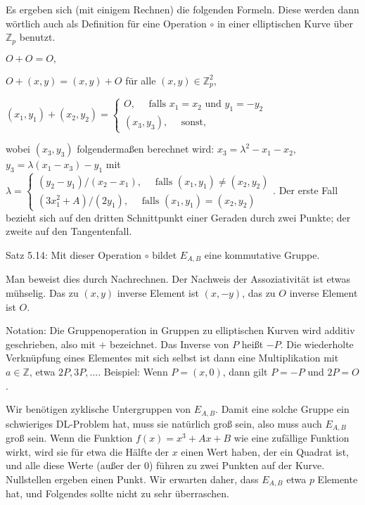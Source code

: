 \documentclass[a4paper]{article}
\begin{document}
\begin{multicols}{3}
    Es ergeben sich (mit einigem Rechnen) die folgenden Formeln. Diese werden dann wörtlich auch als Definition für eine Operation $\circ$ in einer elliptischen Kurve über $\mathbb{Z}_p$ benutzt.
    \begin{itemize*}
        \item $O+O=O,$
        \item $O+ (x,y) = (x,y) +O$ für alle $(x,y)\in\mathbb{Z}^2_p$,
        \item $(x_1,y_1) + (x_2,y_2) =\begin{cases} O,\quad\text{ falls } x_1=x_2 \text{ und } y_1=-y_2 \\ (x_3,y_3),\quad\text{ sonst,}\end{cases}$
    \end{itemize*}

    wobei $(x_3,y_3)$ folgendermaßen berechnet wird: $x_3=\lambda^2-x_1-x_2$, $y_3=\lambda(x_1-x_3)-y_1$ mit $\lambda=\begin{cases} (y_2-y_1)/(x_2-x_1),\quad\text{ falls } (x_1,y_1)\not= (x_2,y_2)\\ (3x^2_1+A)/(2y_1),\quad\text{ falls } (x_1,y_1) = (x_2,y_2)\end{cases}$.
    Der erste Fall bezieht sich auf den dritten Schnittpunkt einer Geraden durch zwei Punkte; der zweite auf den Tangentenfall.

    Satz 5.14: Mit dieser Operation $\circ$ bildet $E_{A,B}$ eine kommutative Gruppe.

    Man beweist dies durch Nachrechnen. Der Nachweis der Assoziativität ist etwas mühselig. Das zu $(x,y)$ inverse Element ist $(x,-y)$, das zu $O$ inverse Element ist $O$.

    Notation: Die Gruppenoperation in Gruppen zu elliptischen Kurven wird additiv geschrieben, also mit $+$ bezeichnet. Das Inverse von $P$ heißt $-P$. Die wiederholte Verknüpfung eines Elementes mit sich selbst ist dann eine Multiplikation mit $a\in\mathbb{Z}$, etwa $2P, 3P,...$.
    Beispiel: Wenn $P=(x,0)$, dann gilt $P=-P$ und $2P=O$.

    Wir benötigen zyklische Untergruppen von $E_{A,B}$. Damit eine solche Gruppe ein schwieriges DL-Problem hat, muss sie natürlich groß sein, also muss auch $E_{A,B}$ groß sein. Wenn die Funktion $f(x) =x^3+Ax+B$ wie eine zufällige Funktion wirkt, wird sie für etwa die Hälfte der $x$ einen Wert haben, der ein Quadrat ist, und alle diese Werte (außer der $0$) führen zu zwei Punkten auf der Kurve. Nullstellen ergeben einen Punkt. Wir erwarten daher, dass $E_{A,B}$ etwa $p$ Elemente hat, und Folgendes sollte nicht zu sehr überraschen.


\end{multicols}
\end{document}

